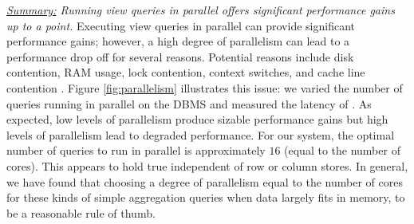 {\em \underline{Summary:} Running view queries in parallel offers significant
performance gains up to a point.}
Executing view queries in parallel can provide significant performance gains;
however, a high degree of parallelism can lead to a performance drop off for
several reasons. Potential reasons include disk contention, RAM usage, lock
contention, context switches, and cache line contention \cite{Postgres_wiki}. 
Figure \ref{fig:parallelism} illustrates this issue: we varied the number of
queries running in parallel on the DBMS and measured the latency of
\VizRecDB.
As expected, low levels of parallelism produce sizable performance gains but
high levels of parallelism lead to degraded performance.
For our system, the optimal number of queries to run in parallel is
approximately $16$ (equal to the number of cores). 
This appears to hold true independent of row or column stores. 
In general, we have found that choosing a degree of parallelism equal to the number of cores
for these kinds of simple aggregation queries when data largely fits in memory,
to be a reasonable rule of thumb.  



